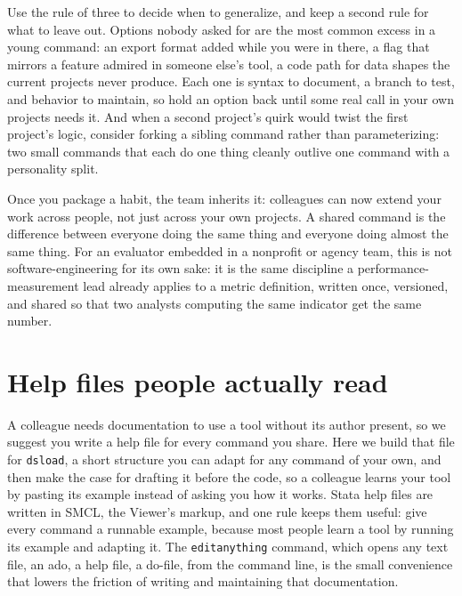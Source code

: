 \documentclass[
    a4paper,
    fontsize=10pt,
    twoside=true,
    numbers=noenddot,
]{kaobook}
\begin{document}
Use the rule of three to decide when to generalize, and keep a second rule for what to leave out. Options nobody asked for are the most common excess in a young command: an export format added while you were in there, a flag that mirrors a feature admired in someone else's tool, a code path for data shapes the current projects never produce. Each one is syntax to document, a branch to test, and behavior to maintain, so hold an option back until some real call in your own projects needs it. And when a second project's quirk would twist the first project's logic, consider forking a sibling command rather than parameterizing: two small commands that each do one thing cleanly outlive one command with a personality split.

Once you package a habit, the team inherits it: colleagues can now extend your work across people, not just across your own projects. A shared command is the difference between everyone doing the same thing and everyone doing almost the same thing. For an evaluator embedded in a nonprofit or agency team, this is not software-engineering for its own sake: it is the same discipline a performance-measurement lead already applies to a metric definition, written once, versioned, and shared so that two analysts computing the same indicator get the same number.

\section{Help files people actually read}
A colleague needs documentation to use a tool without its author present, so we suggest you write a help file for every command you share. Here we build that file for \texttt{dsload}, a short structure you can adapt for any command of your own, and then make the case for drafting it before the code, so a colleague learns your tool by pasting its example instead of asking you how it works. Stata help files are written in SMCL, the Viewer's markup, and one rule keeps them useful: give every command a runnable example, because most people learn a tool by running its example and adapting it. The \texttt{editanything} command, which opens any text file, an ado, a help file, a do-file, from the command line, is the small convenience that lowers the friction of writing and maintaining that documentation.
\end{document}
